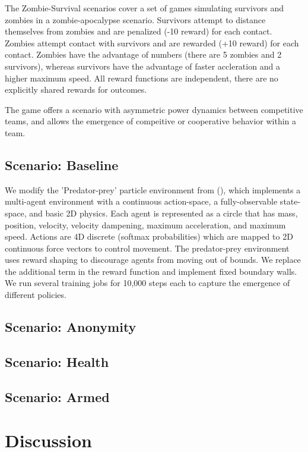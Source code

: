 \documentclass[11pt,a4paper]{article}
\begin{document}
The Zombie-Survival scenarios cover a set of games simulating survivors and zombies in a zombie-apocalypse scenario.
Survivors attempt to distance themselves from zombies and are penalized (-10 reward) for each contact.
Zombies attempt contact with survivors and are rewarded (+10 reward) for each contact.
Zombies have the advantage of numbers (there are 5 zombies and 2 survivors), whereas survivors have the advantage of faster accleration and a higher maximum speed.
All reward functions are independent, there are no explicitly shared rewards for outcomes.

The game offers a scenario with asymmetric power dynamics between competitive teams, and allows the emergence of compeitive or cooperative behavior within a team.

\subsection{Scenario: Baseline}
\label{sec:baseline}

We modify the 'Predator-prey' particle environment from (), which implements a multi-agent environment with a continuous action-space, a fully-observable state-space, and basic 2D physics.
Each agent is represented as a circle that has mass, position, velocity, velocity dampening, maximum acceleration, and maximum speed. Actions are 4D discrete (softmax probabilities) which are mapped to 2D continuous force vectors to control movement. The predator-prey environment uses reward shaping to discourage agents from moving out of bounds.
We replace the additional term in the reward function and implement fixed boundary walls.
We run several training jobs for 10,000 steps each to capture the emergence of different policies.

\subsection{Scenario: Anonymity}
\label{sec:anon}

\subsection{Scenario: Health}
\label{sec:health}

\subsection{Scenario: Armed}
\label{sec:arms}

\section{Discussion}
\label{sec:discussion}
\end{document}
